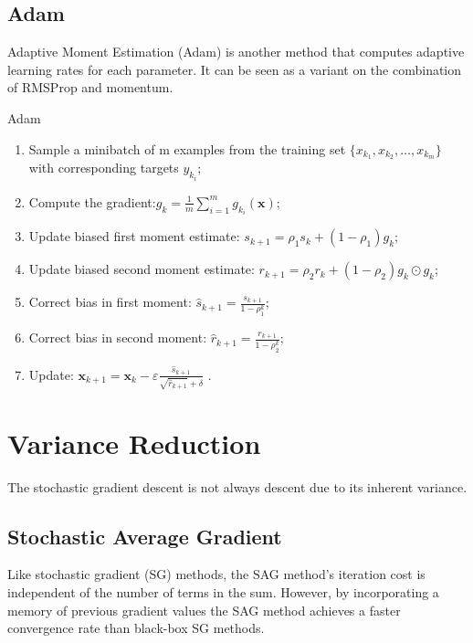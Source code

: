 \documentclass[11pt]{article} %
\begin{document}
\begin{algorithm}[htb]
\begin{algorithm}[htb]
\end{algorithm}

\subsection{Adam}
Adaptive Moment Estimation (Adam) is another method that computes adaptive learning rates for each parameter.
It can be seen as a variant on the combination of RMSProp and momentum.

\begin{algorithm}[]
\caption{Adam}
\label{Adam}
    \begin{enumerate}
              \item  Sample a minibatch of m examples from the training set $\{x_{k_1}, x_{k_2}, \dots, x_{k_m}\}$ with corresponding targets $y_{k_i}$;
              \item  Compute the gradient:$g_{k} = \frac{1}{m}\sum_{i=1}^{m}g_{k_{i}}({\textbf{x}})$;
              \item  Update biased first moment estimate: $s_{k+1}={\rho}_1 s_k + (1-{\rho}_1)g_k$;
              \item  Update biased second moment estimate: $r_{k+1}={\rho}_2 r_k + (1-{\rho}_2)g_k\odot g_k$;
              \item  Correct bias in first moment: $\hat s_{k+1}=\frac{s_{k+1}}{1-{\rho}_{1}^k}$;
              \item  Correct bias in second moment: $\hat r_{k+1}=\frac{r_{k+1}}{1-{\rho}_{2}^k}$;
              \item  Update: ${\textbf{x}}_{k+1}={\textbf{x}}_k -\varepsilon \frac{\hat s_{k+1}}{\sqrt{\hat r_{k+1}}+\delta}$ .
    \end{enumerate}
\end{algorithm}

\section{Variance Reduction}
The stochastic gradient descent is not always descent due to its inherent variance.

\subsection{Stochastic Average Gradient}
Like stochastic gradient (SG) methods, the SAG method’s iteration cost is independent of the number of terms in the sum.
However, by incorporating a memory of previous gradient values the SAG method achieves a faster convergence rate than black-box SG methods.



\end{algorithm}
\end{document}
